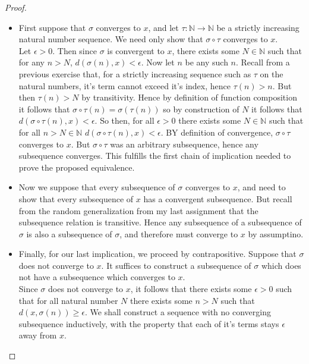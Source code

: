 \documentclass[11pt]{article}
\newcommand{\N}{\mathbb{N}}
\theoremstyle{definition}
\begin{document}
\begin{proof}
\begin{itemize}
\item
First suppose that $\sigma$ converges to $x$, and let $\tau : \N\to \N$ be a strictly increasing natural number sequence. We need only show that $\sigma\circ \tau$ converges to $x$. \\

Let $\epsilon > 0$. Then since $\sigma$ is convergent to $x$, there exists some $N\in \N$ such that for any $n>N$, $d(\sigma(n), x) < \epsilon.$ Now let $n$ be any such $n$. Recall from a previous exercise that, for a strictly increasing sequence such as $\tau$ on the natural numbers, it's term cannot exceed it's index, hence $\tau(n) > n$. But then $\tau(n) > N$ by transitivity. Hence by definition of function composition it follows that $\sigma\circ \tau(n) = \sigma(\tau(n))$ so by construction of $N$ it follows that $d(\sigma\circ\tau(n), x) < \epsilon$. So then, for all $\epsilon > 0 $ there exists some $N\in \N $ such that for all $n> N \in \N$ $ d(\sigma\circ\tau(n),x) < \epsilon $. BY definition of convergence, $\sigma\circ \tau$ converges to $x$. But $\sigma\circ \tau$ was an arbitrary subsequence, hence any subsequence converges. This fulfills the first chain of implication needed to prove the proposed equivalence.

\item 
Now we suppose that every subsequence of $\sigma$ converges to $x$, and need to show that every subsequence of $x$ has a convergent subsequence. But recall from the random generalization from my last assignment that the subsequence relation is transitive. Hence any subsequence of a subsequence of $\sigma$ is also a subsequence of $\sigma$, and therefore must converge to $x$ by assumptino.

\item 
Finally, for our last implication, we proceed by contrapositive. Suppose that $\sigma$ does not converge to $x$. It suffices to construct a subsequence of $\sigma$ which does not have a subsequence which converges to $x$. \\

Since $\sigma$ does not converge to $x$, it follows that there exists some $\epsilon> 0 $ such that for all natural number $N$ there exists some $n > N$ such that $d(x, \sigma(n)) \ge \epsilon$. We shall construct a sequence with no converging subsequence inductively, with the property that each of it's terms stays $\epsilon$ away from $x$. \\


\end{itemize}
\end{proof}
\end{document}
